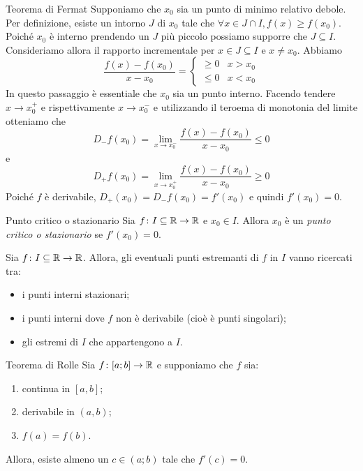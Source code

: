 \documentclass[a4paper]{article}
\begin{document}
\begin{snippetproof}{Teorema di Fermat}
    Supponiamo che \(x_0\) sia un punto di minimo relativo debole.
    Per definizione, esiste un intorno \(J\) di \(x_0\)
    tale che \(\forall x \in J \cap I, f(x) \geq f(x_0)\).
    Poiché \(x_0\) è interno prendendo un \(J\) più piccolo possiamo
    supporre che \(J \subseteq I\).
    Consideriamo allora il rapporto incrementale per \(x\in J \subseteq I\) e \(x\neq x_0\).
    Abbiamo
    \[
        \frac{f(x) - f(x_0)}{x-x_0}
        = \begin{cases}
            \geq 0 & x > x_0 \\
            \leq 0 & x < x_0
        \end{cases}
    \]
    In questo passaggio è essentiale che \(x_0\) sia un punto interno.
    Facendo tendere \(x\to x_0^+\) e rispettivamente \(x\to x_0^-\) e utilizzando il teroema di monotonia
    del limite otteniamo che
    \[
        D_-f(x_0) = \lim_{x\to x_0^-} \frac{f(x) - f(x_0)}{x-x_0} \leq 0
    \]
    e
    \[
        D_+f(x_0) = \lim_{x\to x_0^+} \frac{f(x) - f(x_0)}{x-x_0} \geq 0
    \]
    Poiché \(f\) è derivabile, \(D_+(x_0) = D_-f(x_0) = f'(x_0)\)
    e quindi \(f'(x_0) = 0\).
\end{snippetproof}

\begin{snippetdefinition}{Punto critico o stazionario}
    Sia \(f\colon I \subseteq \mathbb{R} \to \mathbb{R}\) e \(x_0 \in I\).
    Allora \(x_0\) è un \emph{punto critico o stazionario}
    se \(f'(x_0) = 0\).
\end{snippetdefinition}

\begin{snippetcorollary}{}
    Sia \(f\colon I \subseteq \mathbb{R} \to \mathbb{R}\).
    Allora, gli eventuali punti estremanti di \(f\) in \(I\)
    vanno ricercati tra:
    \begin{itemize}
        \item i punti interni stazionari;
        \item i punti interni dove \(f\) non è derivabile (cioè è punti singolari);
        \item gli estremi di \(I\) che appartengono a \(I\).
    \end{itemize}
\end{snippetcorollary}

\begin{snippettheorem}{Teorema di Rolle}
    Sia \(f\colon [a;b] \to \mathbb{R}\) e supponiamo che \(f\)
    sia:
    \begin{enumerate}
        \item continua in \([a,b]\);
        \item derivabile in \((a,b)\);
        \item \(f(a) = f(b)\).
    \end{enumerate}
    Allora, esiste almeno un \(c \in (a;b)\) tale che \(f'(c) = 0\).
\end{snippettheorem}
\end{document}
